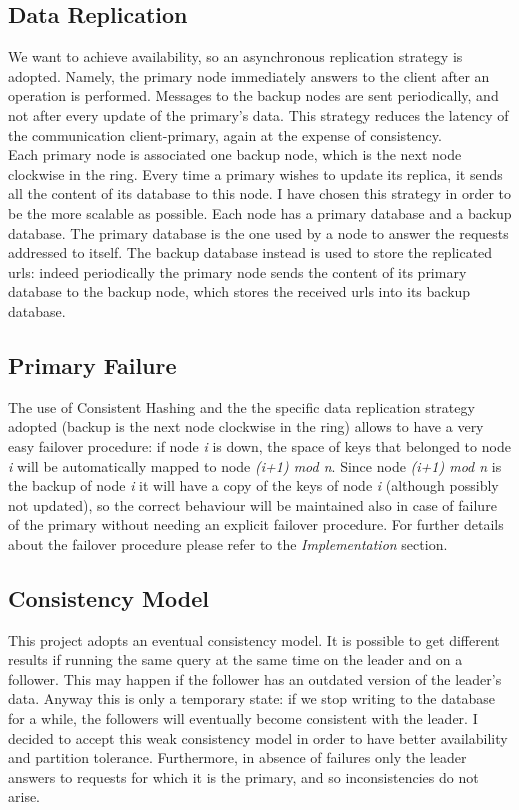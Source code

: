 \documentclass{article}
\begin{document}
\subsection{Data Replication}
We want to achieve availability, so an asynchronous replication strategy is adopted. Namely, the primary node immediately answers to the client after an operation is performed. Messages to the backup nodes are sent periodically, and not after every update of the primary's data. This strategy reduces the latency of the communication client-primary, again at the expense of consistency. \\
Each primary node is associated one backup node, which is the next node clockwise in the ring. Every time a primary wishes to update its replica, it sends all the content of its database to this node. I have chosen this strategy in order to be the more scalable as possible. Each node has a primary database and a backup database. The primary database is the one used by a node to answer the requests addressed to itself. The backup database instead is used to store the replicated urls: indeed periodically the primary node sends the content of its primary database to the backup node, which stores the received urls into its backup database.

\subsection{Primary Failure}
The use of Consistent Hashing and the the specific data replication strategy adopted (backup is the next node clockwise in the ring) allows to have a very easy failover procedure: if node \textit{i} is down, the space of keys that belonged to node \textit{i} will be automatically mapped to node \textit{(i+1) mod n}. Since node \textit{(i+1) mod n} is the backup of node \textit{i} it will have a copy of the keys of node \textit{i} (although possibly not updated), so the correct behaviour will be maintained also in case of failure of the primary without needing an explicit failover procedure. For further details about the failover procedure please refer to the  \textit{Implementation} section.    


\subsection{Consistency Model}
This project adopts an eventual consistency model. It is possible to get different results if running the same query at the same time on the leader and on a follower. This may happen if the follower has an outdated version of the leader's data. Anyway this is only a temporary state: if we stop writing to the database for a while, the followers will eventually become consistent with the leader. I decided to accept this weak consistency model in order to have better availability and partition tolerance. Furthermore, in absence of failures only the leader answers to requests for which it is the primary, and so inconsistencies do not arise.
\end{document}
